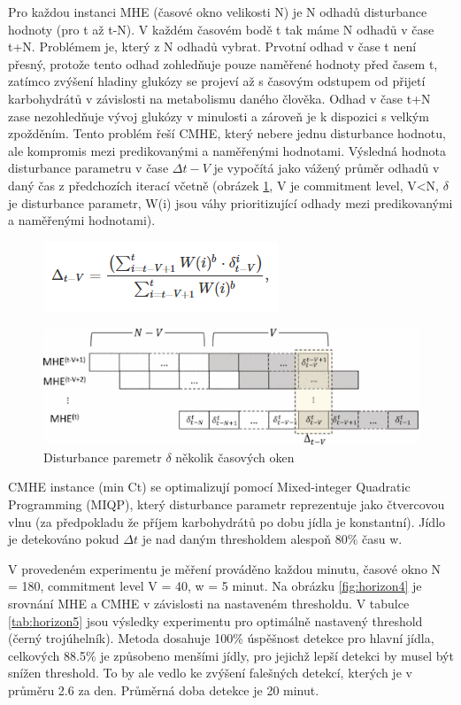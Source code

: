 Pro každou instanci MHE (časové okno velikosti N) je N odhadů disturbance hodnoty (pro t až t-N). V každém časovém bodě t tak máme N odhadů v čase t+N. Problémem je, který z N odhadů vybrat. Prvotní odhad v čase t není přesný, protože tento odhad zohledňuje pouze naměřené hodnoty před časem t, zatímco zvýšení hladiny glukózy se projeví až s časovým odstupem od přijetí karbohydrátů v závislosti na metabolismu daného člověka. Odhad v čase t+N zase nezohledňuje vývoj glukózy v minulosti a zároveň je k dispozici s velkým zpožděním. Tento problém řeší CMHE, který nebere jednu disturbance hodnotu, ale kompromis mezi predikovanými a naměřenými hodnotami. Výsledná hodnota disturbance parametru v čase $\Delta t-V$ je vypočítá jako vážený průměr odhadů v daný čas z předchozích iterací včetně (obrázek \ref{fig:horizon1}, V je commitment level, V<N, $\delta$ je disturbance parametr, W(i) jsou váhy prioritizující odhady mezi predikovanými a naměřenými hodnotami).

\begin{figure}[H]
\includegraphics{img/analyza/horizon2.png}
\end{figure}

\begin{figure}[H]
\caption{Disturbance paremetr $\delta$ několik časových oken}
\label{fig:horizon1}
\centering
\includegraphics[width=1\textwidth]{img/analyza/horizon1.png}
\end{figure}

CMHE instance (min Ct) se optimalizují pomocí Mixed-integer Quadratic Programming (MIQP), který disturbance parametr reprezentuje jako čtvercovou vlnu (za předpokladu že příjem karbohydrátů po dobu jídla je konstantní). Jídlo je detekováno pokud $\Delta t$ je nad daným thresholdem alespoň 80\% času w.

V provedeném experimentu je měření prováděno každou minutu, časové okno N = 180, commitment level V = 40, w = 5 minut. Na obrázku \ref{fig:horizon4} je srovnání MHE a CMHE v závislosti na nastaveném thresholdu.  V tabulce \ref{tab:horizon5} jsou výsledky experimentu pro optimálně nastavený threshold (černý trojúhelník). Metoda dosahuje 100\% úspěšnost detekce pro hlavní jídla, celkových 88.5\% je způsobeno menšími jídly, pro jejichž lepší detekci by musel být snížen threshold. To by ale vedlo ke zvýšení falešných detekcí, kterých je v průměru 2.6 za den. Průměrná doba detekce je 20 minut.

